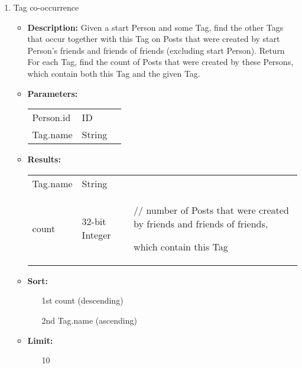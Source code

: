 {\begin{enumerate}
        \item Tag co-occurrence
            \begin{itemize}
                \item \textbf{Description:}
                    Given a start Person and some Tag, find the other Tags that occur
                    together with this Tag on Posts that were created by start Person's
                    friends and friends of friends (excluding start Person).  Return
                    For each Tag, find the count of Posts that were created by these
                    Persons, which contain both this Tag and the given Tag. 
                \item \textbf{Parameters:} \\
                    \begin{tabular}{lll}
                        Person.id 										& ID & \\
                        Tag.name 	 									& String & \parbox[t]{20cm}{\par \strut} \\
                    \end{tabular}		
                \item \textbf{Results:} \\
                    \begin{tabular}{lll}
                        Tag.name 	 						& String & \parbox[t]{20cm}{\par \strut} \\
                        count 								& 32-bit Integer & \parbox[t]{20cm}{// number of Posts that were created by friends and friends of friends, \par 
                    which contain this Tag\strut} \\
                \end{tabular}		
                \item \textbf{Sort:}
                  \begin{itemize}
                    \item[1st] count (descending)
                    \item[2nd] Tag.name (ascending)
                  \end{itemize}
                \item \textbf{Limit:}
                  \begin{itemize}
                    \item[] 10 
                  \end{itemize}
        \end{itemize}


\end{enumerate}}
